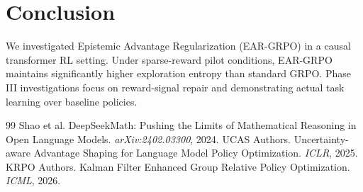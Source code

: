 \documentclass[11pt,a4paper]{article}
\begin{document}
\section{Conclusion}
We investigated Epistemic Advantage Regularization (EAR-GRPO) in a causal transformer RL setting. Under sparse-reward pilot conditions, EAR-GRPO maintains significantly higher exploration entropy than standard GRPO. Phase III investigations focus on reward-signal repair and demonstrating actual task learning over baseline policies.


\begin{thebibliography}{99}
 Shao et al. DeepSeekMath: Pushing the Limits of Mathematical Reasoning in Open Language Models. \textit{arXiv:2402.03300}, 2024.
 UCAS Authors. Uncertainty-aware Advantage Shaping for Language Model Policy Optimization. \textit{ICLR}, 2025.
 KRPO Authors. Kalman Filter Enhanced Group Relative Policy Optimization. \textit{ICML}, 2026.
\end{thebibliography}
\end{document}
